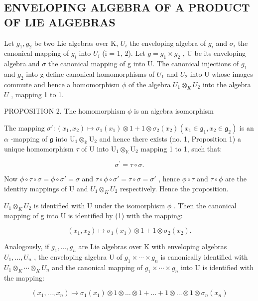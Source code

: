 \subsection{ENVELOPING ALGEBRA OF A PRODUCT OF LIE ALGEBRAS}

Let \(g_{1}, g_{2}\) be two Lie algebras over K, \(U_{i}\) the enveloping algebra of \(g_{i}\) and \(\sigma_{i}\) the canonical mapping of \(g_{i}\) into \(U_{i}\) (i = 1, 2). Let \(g = g_{1} \times g_{2}\) , U be its enveloping algebra and \(\sigma\) the canonical mapping of g into U. The canonical injections of \(g_{1}\) and \(g_{2}\) into g define canonical homomorphisms of \(U_{1}\) and \(U_{2}\) into U whose images commute and hence a homomorphism \(\phi\) of the algebra \(U_1 \otimes_K U_2\) into the algebra \(U\) , mapping 1 to 1.

PROPOSITION 2. The homomorphism \(\phi\) is an algebra isomorphism

The mapping \(\sigma': (x_1, x_2) \mapsto \sigma_1(x_1) \otimes 1 + 1 \otimes \sigma_2(x_2) (x_1 \in \mathfrak{g}_1, x_2 \in \mathfrak{g}_2)\) is an \(\alpha\) -mapping of \(\mathfrak{g}\) into \(\mathrm{U}_1 \otimes_{\mathbb{K}} \mathrm{U}_2\) and hence there exists (no. 1, Proposition 1) a unique homomorphism \(\tau\) of \(\mathrm{U}\) into \(\mathrm{U}_1 \otimes_{\mathbb{K}} \mathrm{U}_2\) mapping 1 to 1, such that:

\[
\sigma^ {\prime} = \tau \circ \sigma .\tag{1}
\]

Now \(\phi \circ \tau \circ \sigma = \phi \circ \sigma' = \sigma\) and \(\tau \circ \phi \circ \sigma' = \tau \circ \sigma = \sigma'\) , hence \(\phi \circ \tau\) and \(\tau \circ \phi\) are the identity mappings of U and \(U_1 \otimes_K U_2\) respectively. Hence the proposition.

\(U_{1} \otimes_{K} U_{2}\) is identified with U under the isomorphism \(\phi\) . Then the canonical mapping of g into U is identified by (1) with the mapping:

\[
(x _ {1}, x _ {2}) \mapsto \sigma_ {1} (x _ {1}) \otimes 1 + 1 \otimes \sigma_ {2} (x _ {2}).
\]

Analogously, if \(g_{1},\ldots,g_{n}\) are Lie algebras over K with enveloping algebras \(U_{1},\ldots,U_{n}\) , the enveloping algebra U of \(g_{1}\times\cdots\times g_{n}\) is canonically identified with \(U_{1}\otimes_{K}\cdots\otimes_{K}U_{n}\) and the canonical mapping of \(g_{1}\times\cdots\times g_{n}\) into U is identified with the mapping:

\[
(x _ {1}, \dots , x _ {n}) \mapsto \sigma_ {1} (x _ {1}) \otimes 1 \otimes \dots \otimes 1 + \dots + 1 \otimes \dots \otimes 1 \otimes \sigma_ {n} (x _ {n})
\]

